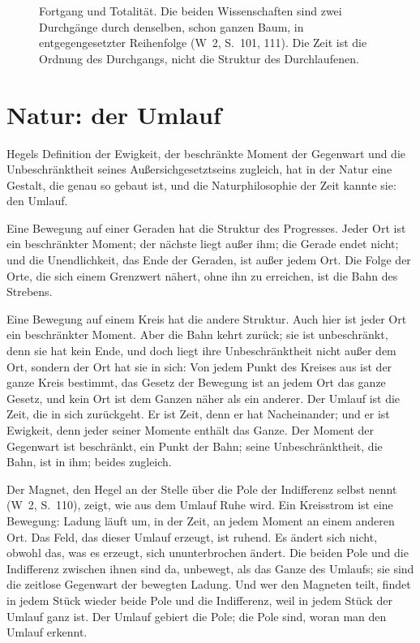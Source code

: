 \documentclass[11pt,a4paper]{article}
\newcommand{\Werke}[1]{(W~2, S.~#1)}
\begin{document}
\begin{figure}[!htb]
{}
\caption{Fortgang und Totalität. Die beiden Wissenschaften sind zwei Durchgänge durch denselben, schon ganzen Baum, in entgegengesetzter Reihenfolge (W~2, S.~101, 111). Die Zeit ist die Ordnung des Durchgangs, nicht die Struktur des Durchlaufenen.}
\label{fig:durchgang}
\end{figure}

\section{Natur: der Umlauf}

Hegels Definition der Ewigkeit, der beschränkte Moment der Gegenwart und die Unbeschränktheit seines Außersichgesetztseins zugleich, hat in der Natur eine Gestalt, die genau so gebaut ist, und die Naturphilosophie der Zeit kannte sie: den Umlauf.

Eine Bewegung auf einer Geraden hat die Struktur des Progresses. Jeder Ort ist ein beschränkter Moment; der nächste liegt außer ihm; die Gerade endet nicht; und die Unendlichkeit, das Ende der Geraden, ist außer jedem Ort. Die Folge der Orte, die sich einem Grenzwert nähert, ohne ihn zu erreichen, ist die Bahn des Strebens.

Eine Bewegung auf einem Kreis hat die andere Struktur. Auch hier ist jeder Ort ein beschränkter Moment. Aber die Bahn kehrt zurück; sie ist unbeschränkt, denn sie hat kein Ende, und doch liegt ihre Unbeschränktheit nicht außer dem Ort, sondern der Ort hat sie in sich: Von jedem Punkt des Kreises aus ist der ganze Kreis bestimmt, das Gesetz der Bewegung ist an jedem Ort das ganze Gesetz, und kein Ort ist dem Ganzen näher als ein anderer. Der Umlauf ist die Zeit, die in sich zurückgeht. Er ist Zeit, denn er hat Nacheinander; und er ist Ewigkeit, denn jeder seiner Momente enthält das Ganze. Der Moment der Gegenwart ist beschränkt, ein Punkt der Bahn; seine Unbeschränktheit, die Bahn, ist in ihm; beides zugleich.

Der Magnet, den Hegel an der Stelle über die Pole der Indifferenz selbst nennt \Werke{110}, zeigt, wie aus dem Umlauf Ruhe wird. Ein Kreisstrom ist eine Bewegung: Ladung läuft um, in der Zeit, an jedem Moment an einem anderen Ort. Das Feld, das dieser Umlauf erzeugt, ist ruhend. Es ändert sich nicht, obwohl das, was es erzeugt, sich ununterbrochen ändert. Die beiden Pole und die Indifferenz zwischen ihnen sind da, unbewegt, als das Ganze des Umlaufs; sie sind die zeitlose Gegenwart der bewegten Ladung. Und wer den Magneten teilt, findet in jedem Stück wieder beide Pole und die Indifferenz, weil in jedem Stück der Umlauf ganz ist. Der Umlauf gebiert die Pole; die Pole sind, woran man den Umlauf erkennt.
\end{document}
